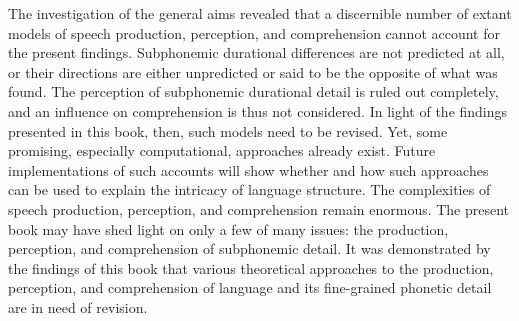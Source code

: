 The investigation of the general aims revealed that a discernible number of extant models of speech production, perception, and comprehension cannot account for the present findings. Subphonemic durational differences are not predicted at all, or their directions are either unpredicted or said to be the opposite of what was found. The perception of subphonemic durational detail is ruled out completely, and an influence on comprehension is thus not considered. In light of the findings presented in this book, then, such models need to be revised. Yet, some promising, especially computational, approaches already exist. Future implementations of such accounts will show whether and how such approaches can be used to explain the intricacy of language structure.
The complexities of speech production, perception, and comprehension remain enormous. The present book may have shed light on only a few of many issues: the production, perception, and comprehension of subphonemic detail. It was demonstrated by the findings of this book that various theoretical approaches to the production, perception, and comprehension of language and its fine-grained phonetic detail are in need of revision. 
